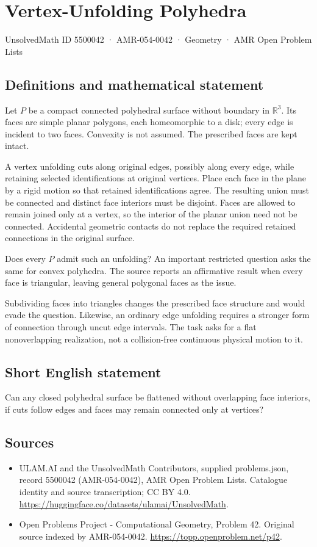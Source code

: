 \documentclass[11pt,a4paper]{article}
\begin{document}
\section*{Vertex-Unfolding Polyhedra}\label{5500042}
{\small UnsolvedMath ID 5500042 · AMR-054-0042 · Geometry · AMR Open Problem Lists}
\subsection{Definitions and mathematical statement}
Let $P$ be a compact connected polyhedral surface without boundary in
$\mathbb R^3$. Its faces are simple planar polygons, each homeomorphic
to a disk; every edge is incident to two faces. Convexity is not
assumed. The prescribed faces are kept intact.

A vertex unfolding cuts along original edges, possibly along every
edge, while retaining selected identifications at original vertices.
Place each face in the plane by a rigid motion so that retained
identifications agree. The resulting union must be connected and
distinct face interiors must be disjoint. Faces are allowed to
remain joined only at a vertex, so the interior of the planar union
need not be connected. Accidental geometric contacts do not replace
the required retained connections in the original surface.

Does every $P$ admit such an unfolding? An important restricted
question asks the same for convex polyhedra. The source reports an
affirmative result when every face is triangular, leaving general
polygonal faces as the issue.

Subdividing faces into triangles changes the prescribed face
structure and would evade the question. Likewise, an ordinary
edge unfolding requires a stronger form of connection through
uncut edge intervals. The task asks for a flat nonoverlapping
realization, not a collision-free continuous physical motion to it.
\subsection{Short English statement}
Can any closed polyhedral surface be flattened without overlapping
face interiors, if cuts follow edges and faces may remain connected
only at vertices?
\subsection{Sources}
\begin{itemize}
\item[S1] ULAM.AI and the UnsolvedMath Contributors, supplied problems.json, record 5500042 (AMR-054-0042), AMR Open Problem Lists. Catalogue identity and source transcription; CC BY 4.0.
\url{https://huggingface.co/datasets/ulamai/UnsolvedMath}.
\item[S2] Open Problems Project - Computational Geometry, Problem 42. Original source indexed by AMR-054-0042.
\url{https://topp.openproblem.net/p42}.
\end{itemize}
\end{document}
